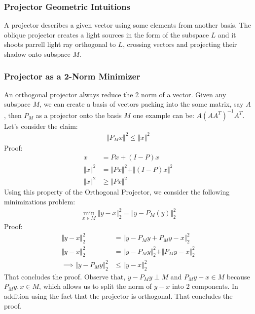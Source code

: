 \documentclass[]{article}
\theoremstyle{definition}
\begin{document}
            \subsubsection{Projector Geometric Intuitions}
                A projector describes a given vector using some elements from another basis. The oblique projector creates a light sources in the form of the subspace $L$ and it shoots parrell light ray orthogonal to $L$, crossing vectors and projecting their shadow onto subspace $M$. 
        \subsubsection{Projector as a 2-Norm Minimizer}
            An orthogonal projector always reduce the 2 norm of a vector. Given any subspace $M$, we can create a basis of vectors packing into the some matrix, say $A$, then $P_M$ as a projector onto the basis $M$ one example can be: $A(AA^T)^{-1}A^T$. Let's consider the claim: 
            \begin{align}
                \Vert P_Mx\Vert^2 \le \Vert x\Vert^2
            \end{align}
            Proof: 
            \begin{align}
                x &= Px + (I - P)x 
                \\
                \Vert x\Vert^2 &= \Vert Px\Vert^2 + \Vert (I - P)x\Vert^2
                \\
                \Vert x\Vert^2 &\ge \Vert Px\Vert^2
            \end{align}
            Using this property of the Orthogonal Projector, we consider the following minimizations problem: 
            \begin{align}
                \min_{x\in M} \Vert y - x\Vert_2^2 = \Vert y - P_M(y)\Vert_2^2
            \end{align}
            Proof:
            \begin{align}
                \Vert y - x\Vert_2^2 &= 
                \Vert y - P_My + P_My - x\Vert_2^2
                \\
                \Vert y - x\Vert_2^2 &= 
                \Vert y - P_My\Vert_2^2 + \Vert P_My - x\Vert_2^2
                \\
                \implies 
                \Vert y - P_My\Vert_2^2 &\le \Vert y - x\Vert_2^2
            \end{align}
            That concludes the proof. Observe that, $y - P_My\perp M$ and $P_My - x \in M$ because $P_My, x \in M$, which allows us to split the norm of $y - x$ into 2 components. In addition using the fact that the projector is orthogonal. That concludes the proof. 
\end{document}
